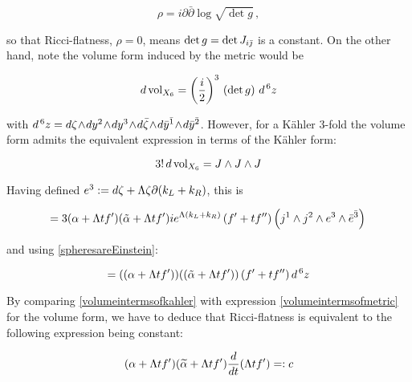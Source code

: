 \begin{equation}
	\rho = i \partial \bar\partial \log \sqrt{ \det g}\,,
	\label{}
\end{equation}

so that Ricci-flatness, $\rho = 0$, means $\det g = \det {J_{i\bar{\jmath}}}$ is a constant. On the other hand, note the volume form induced by the metric would be

\begin{equation}
	d\operatorname{vol}_{X_6} = \left(\frac{i}{2}\right)^3\, \left(\det g\right) \, d^{\,6} z
	\label{volumeintermsofmetric}
\end{equation}

with $d^{\,6} z = d\zeta \twedge dy^2 \twedge dy^3 \twedge d\bar \zeta \twedge d\bar y^{\bar 1} \twedge d\bar y^{\bar 2}$. However, for a K\"ahler $3$-fold the volume form admits the equivalent expression in terms of the K\"ahler form:

\begin{equation}
	3! \, d\operatorname{vol}_{X_6} = J\wedge J \wedge J 	\label{}
\end{equation}

Having defined $e^3 := d\zeta + \Lambda \zeta \partial (k_L + k_R)$, this is

\begin{equation}
	= 3 (\alpha + \Lambda t f') (\tilde\alpha + \Lambda t f') i e^{\Lambda(k_L + k_R)} \left(f'+tf''\right) \left(j^1 \wedge j^2 \wedge e^3 \wedge \bar e^{\bar 3} \right)\,
	\label{}
\end{equation}

and using \eqref{spheresareEinstein}:

\begin{equation}
	= ((\alpha + \Lambda t f'))((\tilde\alpha + \Lambda t f')) \left( f' +tf'' \right) d^{\,6} z
	\label{volumeintermsofkahler}
\end{equation}

By comparing \eqref{volumeintermsofkahler} with expression \eqref{volumeintermsofmetric} for the volume form, we have to deduce that Ricci-flatness is equivalent to the following expression being constant:


\begin{equation}
	(\alpha + \Lambda t f')(\widetilde{\alpha} + \Lambda t f') \frac{d}{dt} (\Lambda t f') =: c 
\end{equation}

